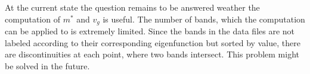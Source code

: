 At the current state the question remains to be answered weather the computation of $m^{*}$ and $v_g$ is useful. The number of bands, which the computation can be applied to is extremely limited. Since the bands in the data files are not labeled according to their corresponding eigenfunction but sorted by value, there are discontinuities at each point, where two bands intersect. This problem might be solved in the future. 













%
%    


